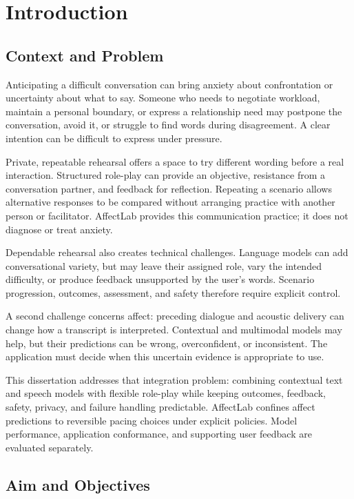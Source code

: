 \chapter{Introduction}\label{chap1}

\section{Context and Problem}
\label{sec:context-motivation}
\label{sec:problem-statement}

Anticipating a difficult conversation can bring anxiety about confrontation or uncertainty about what to say. Someone who needs to negotiate workload, maintain a personal boundary, or express a relationship need may postpone the conversation, avoid it, or struggle to find words during disagreement. A clear intention can be difficult to express under pressure.

Private, repeatable rehearsal offers a space to try different wording before a real interaction. Structured role-play can provide an objective, resistance from a conversation partner, and feedback for reflection. Repeating a scenario allows alternative responses to be compared without arranging practice with another person or facilitator. AffectLab provides this communication practice; it does not diagnose or treat anxiety.

Dependable rehearsal also creates technical challenges. Language models can add conversational variety, but may leave their assigned role, vary the intended difficulty, or produce feedback unsupported by the user's words. Scenario progression, outcomes, assessment, and safety therefore require explicit control.

A second challenge concerns affect: preceding dialogue and acoustic delivery can change how a transcript is interpreted. Contextual and multimodal models may help, but their predictions can be wrong, overconfident, or inconsistent. The application must decide when this uncertain evidence is appropriate to use.

This dissertation addresses that integration problem: combining contextual text and speech models with flexible role-play while keeping outcomes, feedback, safety, privacy, and failure handling predictable. AffectLab confines affect predictions to reversible pacing choices under explicit policies. Model performance, application conformance, and supporting user feedback are evaluated separately.

\section{Aim and Objectives}
\label{sec:dissertation-aim}
\label{sec:dissertation-objectives}

